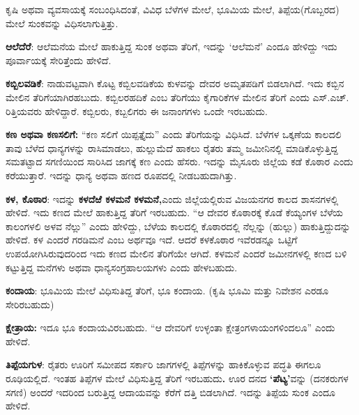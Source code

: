 ಕೃಷಿ ಅಥವಾ ವ್ಯವಸಾಯಕ್ಕೆ ಸಂಬಂಧಿಸಿದಂತೆ, ವಿವಿಧ ಬೆಳೆಗಳ ಮೇಲೆ, ಭೂಮಿಯ ಮೇಲೆ, ತಿಪ್ಪೆಯ(ಗೊಬ್ಬರದ) ಮೇಲೆ ಸುಂಕವನ್ನು ವಿಧಿಸಲಾಗುತ್ತಿತ್ತು.

\textbf{ಆಲೆದೆರೆ}: ಆಲೆಮನೆಯ ಮೇಲೆ ಹಾಕುತ್ತಿದ್ದ ಸುಂಕ ಅಥವಾ ತೆರಿಗೆ, ಇದನ್ನು ‘ಆಲೆಮನೆ’ ಎಂದೂ ಹೇಳಿದ್ದು ಇದು ಪೂರ್ವಾಯಕ್ಕೆ ಸೇರಿತ್ತೆಂದು ಹೇಳಿದೆ.

\textbf{ಕಬ್ಬಿಲವಡಿಕೆ}: ನಾಡುವಟ್ಟವಾಗಿ ಕೊಟ್ಟ ಕಬ್ಬಿಲವಡಿಕೆಯ ಕುಳವನ್ನು ದೇವರ ಅಮೃತಪಡಿಗೆ ಬಿಡಲಾಗಿದೆ. ಇದು ಕಬ್ಬಿನ ಮೇಲಿನ ತೆರಿಗೆಯಾಗಿರಹಬುದು. ಕಬ್ಬಿಲರಹದಿಕೆ ಎಂಬ ತೆರಿಗೆಯು ಕೈಗಾರಿಕೆಗಳ ಮೇಲಿನ ತೆರಿಗೆ ಎಂದು ಎಸ್​.ಎಚ್​. ರಿತ್ತಿಯವರು ಹೇಳಿದ್ದಾರೆ. ಕಬ್ಬಿಲರು, ಕಬ್ಬಲಿಗರು ಈ ಜನಾಂಗಗಳು ಒಂದೇ ಇರಬಹುದು.

\textbf{ಕಣ ಅಥವಾ ಕಣಸಲಿಗೆ:} “ಕಣ ಸಲಿಗೆ ಯಿಪ್ಪತ್ತೈದು” ಎಂದು ತೆರಿಗೆಯನ್ನು ವಿಧಿಸಿದೆ. ಬೆಳೆಗಳ ಒಕ್ಕಣೆಯ ಕಾಲದಲಿ ತಾವು ಬೆಳೆದ ಧಾನ್ಯಗಳನ್ನು ರಾಸಿಮಾಡಲು, ಹುಲ್ಲುಮೆದೆ ಹಾಕಲು ರೈತರು ತಮ್ಮ ಜಮೀನಿನಲ್ಲಿ ಮಾಡಿಕೊಳ್ಳುತ್ತಿದ್ದ ಸಮತಟ್ಟಾದ ಸಗಣಿಯಿಂದ ಸಾರಿಸಿದ ಜಾಗಕ್ಕೆ ಕಣ ಎಂದು ಹೆಸರು. ಇದನ್ನು ಮೈಸೂರು ಜಿಲ್ಲೆಯ ಕಡೆ ಕೊಠಾರ ಎಂದು ಕರೆಯುತ್ತಾರೆ. ಇದನ್ನು ಧಾನ್ಯ ಅಥವಾ ಹಣದ ರೂಪದಲ್ಲಿ ನೀಡಬಹುದಾಗಿತ್ತು.

\textbf{ಕಳ, ಕೊಠಾರ}: ಇದನ್ನು \textbf{ಕಳದೆಱೆ ಕಳಮನೆ ಕಳಮನೆ,}ಎಂದು ಜಿಲ್ಲೆಯಲ್ಲಿರುವ ವಿಜಯನಗರ ಕಾಲದ ಶಾಸನಗಳಲ್ಲಿ ಹೇಳಿದೆ. ಇದು ಕಣದ ಮೇಲೆ ಹಾಕುತ್ತಿದ್ದ ತೆರಿಗೆ ಇರಬಹುದು. “ಆ ದೇವರ ಕೊಠಾರಕ್ಕೆ ಕೊಡೆ ಕೆಯ್ಯಂಗಳ ಬೆಳೆಯ ಕಾಲಂಗಳಲಿ ಅಳವ ನೆಲ್ಲು” ಎಂದು ಹೇಳಿದ್ದು, ಬೆಳೆಯ ಕಾಲದಲ್ಲಿ ಕೊಠಾರದಲ್ಲಿ ನೆಲ್ಲನ್ನು (ಹುಲ್ಲು) ಹಾಕುತ್ತಿದ್ದುದನ್ನು ಹೇಳಿದೆ. ಕಳ ಎಂದರೆ ಗರಡಿಮನೆ ಎಂಬ ಅರ್ಥವೂ ಇದೆ. ಆದರೆ ಕಳಕೊಠಾರ ಇವೆರಡನ್ನೂ ಒಟ್ಟಿಗೆ ಉಪಯೋಗಿಸಿರುವುದರಿಂದ ಇದು ಕಣದ ಮೇಲಿನ ತೆರಿಗೆಯೇ ಆಗಿದೆ. ಕಳಮನೆ ಎಂದರೆ ಜಮೀನಗಳಲ್ಲಿ ಕಣದ ಬಳಿ ಕಟ್ಟುತ್ತಿದ್ದ ಮನೆಗಳು ಅಥವಾ ಧಾನ್ಯಸಂಗ್ರಹಾಲಯಗಳು ಎಂದು ಹೇಳಬಹುದು.

\textbf{ಕಂದಾಯ}: ಭೂಮಿಯ ಮೇಲೆ ವಿಧಿಸುತಿದ್ದ ತೆರಿಗೆ, ಭೂ ಕಂದಾಯ. (ಕೃಷಿ ಭೂಮಿ ಮತ್ತು ನಿವೇಶನ ಎರಡೂ ಸೇರಿರಬಹುದು)

\textbf{ಕ್ಷೇತ್ರಾಯ: } ಇದೂ ಭೂ ಕಂದಾಯವಿರಬಹುದು. “ಆ ದೇವರಿಗೆ ಉಳ್ಳಂತಾ ಕ್ಷೇತ್ರಂಗಳಾಯಂಗಳಿಂದಲೂ” ಎಂದು ಹೇಳಿದೆ.

\textbf{ತಿಪ್ಪೆಯಗುಳ}: ರೈತರು ಊರಿಗೆ ಸಮೀಪದ ಸರ್ಕಾರಿ ಜಾಗಗಳಲ್ಲಿ ತಿಪ್ಪೆಗಳನ್ನು ಹಾಕಿಕೊಳ್ಳುವ ಪದ್ಧತಿ ಈಗಲೂ ರೂಢಿಯಲ್ಲಿದೆ. ಇಂತಹ ತಿಪ್ಪೆಗಳ ಮೇಲೆ ವಿಧಿಸುತ್ತಿದ್ದ ತೆರಿಗೆ ಇರಬಹುದು\textbf{.} ಊರ ದನದ \textbf{‘ಪೆಟ್ಯ’}ವನ್ನು (ದನಕರುಗಳ ಸಗಣಿ) ಅಂದರೆ ಇದರಿಂದ ಬರುತ್ತಿದ್ದ ಆದಾಯವನ್ನು ಕೆರೆಗೆ ದತ್ತಿ ಬಿಡಲಾಗಿದೆ. ಇದನ್ನು ತಿಪ್ಪೆಯ ಸುಂಕ ಎಂದೂ ಹೇಳಿದೆ.

